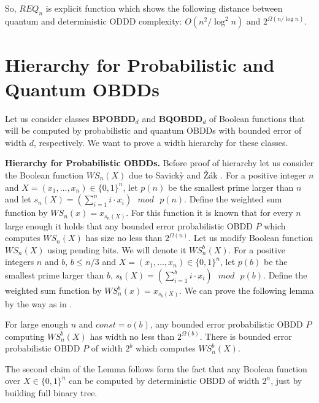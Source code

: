 \documentclass{llncs}
\newcommand{\Beginproof}{{\em Proof.}  }
\newcommand{\Endproof}{\hfill$\Box$\\}
\begin{document}
So, $REQ_n$ is explicit function which shows the following distance between quantum and deterministic ODDD complexity:  $O(n^2/\log^2 n)$ and  $2^{\Omega(n/\log n)}$.

\section{Hierarchy for Probabilistic and Quantum OBDDs}\label{sec:hierarchies}
Let us consider classes {\bf BPOBDD}$_d$ and {\bf BQOBDD}$_d$ of Boolean functions  that will be computed by probabilistic and quantum OBDDs with bounded error of width $d$, respectively. We want to prove a width hierarchy for these classes. 

{\bf Hierarchy for Probabilistic OBDDs.} 
Before proof of hierarchy let us consider the Boolean function $WS_n(X)$ due to Savick{\`y} and {\v{Z}}{\'a}k \cite{sz2000}. For a positive integer $n$ and $X = (x_1, \dots , x_n) \in \{0, 1\}^n$, let $p(n)$ be the smallest
prime larger than $n$ and let $s_n(X) = \left(\sum_{i=1}^{n} i\cdot x_i\right)
\mbox{ }mod\mbox{ }p(n)$. Define the weighted
sum function by $WS_n(x) = x_{s_n(X)}$.
%
For this function it is known that for every $n$ large enough it holds that any bounded error probabilistic OBDD $P$ which computes $WS_n(X)$ has size no less than $2^{\Omega(n)}$.  
%
Let us  modify Boolean function $WS_n(X)$ using pending bits. We will denote it $WS^b_n(X)$. For a positive integers $n$ and $b$, $b\leq n/3$ and $X = (x_1, \dots , x_n) \in \{0, 1\}^n$, let $p(b)$ be the smallest
prime larger than $b$, $s_b(X) = (\sum_{i=1}^{b} i\cdot x_i)
\mbox{ }mod\mbox{ }p(b)$. Define the weighted
sum function by $WS_n^b(x) = x_{s_b(X)}$.
%
We can prove the following lemma by the way as in \cite{sz2000}.

\begin{lemma}\label{lm:ws}
For large enough $n$ and $const=o(b)$,  any bounded error probabilistic OBDD $P$ computing $WS_n^b(X)$ has width no less than $2^{\Omega(b)}$. There is  bounded error probabilistic OBDD $P$ of width $2^b$ which computes $WS_n^b(X)$.  
\end{lemma}

The second claim of the Lemma follows form the fact that any Boolean function over $X  \in \{0, 1\}^n$ can be computed by deterministic OBDD of width $2^n$, just by building full binary tree. 


\end{document}
